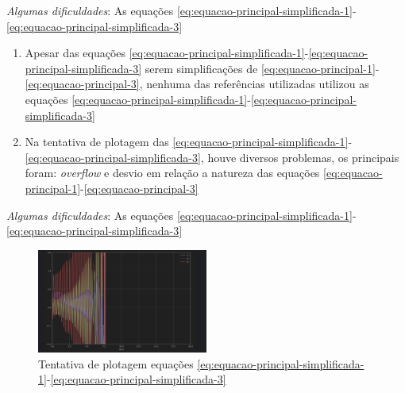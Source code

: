 
\begin{frame}{\textit{Algumas dificuldades}: As equações \eqref{eq:equacao-principal-simplificada-1}-\eqref{eq:equacao-principal-simplificada-3}}
	
	\begin{enumerate}
		\item Apesar das equações \eqref{eq:equacao-principal-simplificada-1}-\eqref{eq:equacao-principal-simplificada-3} serem simplificações de \eqref{eq:equacao-principal-1}-\eqref{eq:equacao-principal-3}, nenhuma das referências utilizadas utilizou as equações \eqref{eq:equacao-principal-simplificada-1}-\eqref{eq:equacao-principal-simplificada-3}
		\item Na tentativa de plotagem das \eqref{eq:equacao-principal-simplificada-1}-\eqref{eq:equacao-principal-simplificada-3}, houve diversos problemas, os principais foram: \textit{overflow} e desvio em relação a natureza das equações \eqref{eq:equacao-principal-1}-\eqref{eq:equacao-principal-3}
	\end{enumerate}
\end{frame}


\begin{frame}{\textit{Algumas dificuldades}: As equações \eqref{eq:equacao-principal-simplificada-1}-\eqref{eq:equacao-principal-simplificada-3}}
		\begin{figure}
		\centering
		\includegraphics[width=0.5\textwidth]{img/erro_simplificado.jpeg}
		\caption{Tentativa de plotagem equações \eqref{eq:equacao-principal-simplificada-1}-\eqref{eq:equacao-principal-simplificada-3}}
		\label{fig:erro-plotagem-eq-simp}
	\end{figure}
\end{frame}


